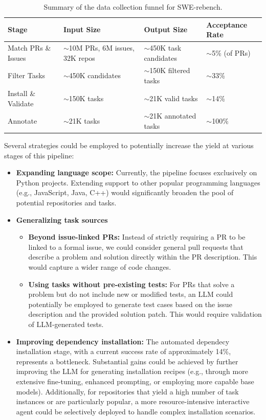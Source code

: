 \documentclass[dandb]{article}
\begin{document}
\begin{table}[htbp]
  \centering
  \caption{Summary of the data collection funnel for SWE-rebench.}
  \label{tab:data_funnel_summary}
  \begin{tabularx}{\textwidth}{@{}lXXX@{}}
    \toprule
    \textbf{Stage} & \textbf{Input Size} & \textbf{Output Size} & \textbf{Acceptance Rate} \\
    \midrule
    Match PRs \& Issues & $\sim$10M PRs, 6M issues, 32K repos & $\sim$450K task candidates & $\sim$5\% (of PRs) \\
    \addlinespace
    Filter Tasks & $\sim$450K candidates & $\sim$150K filtered tasks          & $\sim$33\% \\
    \addlinespace
    Install \& Validate & $\sim$150K tasks & $\sim$21K valid tasks              & $\sim$14\% \\
    \addlinespace
    Annotate & $\sim$21K tasks & $\sim$21K annotated tasks & $\sim$100\% \\
    \bottomrule
  \end{tabularx}
\end{table}

Several strategies could be employed to potentially increase the yield at various stages of this pipeline:


\begin{itemize}
    \item \textbf{Expanding language scope:} Currently, the pipeline focuses exclusively on Python projects. Extending support to other popular programming languages (e.g., JavaScript, Java, C++) would significantly broaden the pool of potential repositories and tasks.
    \item \textbf{Generalizing task sources}
        \begin{itemize}
            \item \textbf{Beyond issue-linked PRs:} Instead of strictly requiring a PR to be linked to a formal issue, we could consider general pull requests that describe a problem and solution directly within the PR description. This would capture a wider range of code changes.
            \item \textbf{Using tasks without pre-existing tests:} For PRs that solve a problem but do not include new or modified tests, an LLM could potentially be employed to generate test cases based on the issue description and the provided solution patch. This would require validation of LLM-generated tests.
        \end{itemize}
     \item \textbf{Improving dependency installation:} The automated dependecy installation stage, with a current success rate of approximately 14\%, represents a bottleneck. Substantial gains could be achieved by further improving the LLM for generating installation recipes (e.g., through more extensive fine-tuning, enhanced prompting, or employing more capable base models). Additionally, for repositories that yield a high number of task instances or are particularly popular, a more resource-intensive interactive agent could be selectively deployed to handle complex installation scenarios.
\end{itemize}
\end{document}
